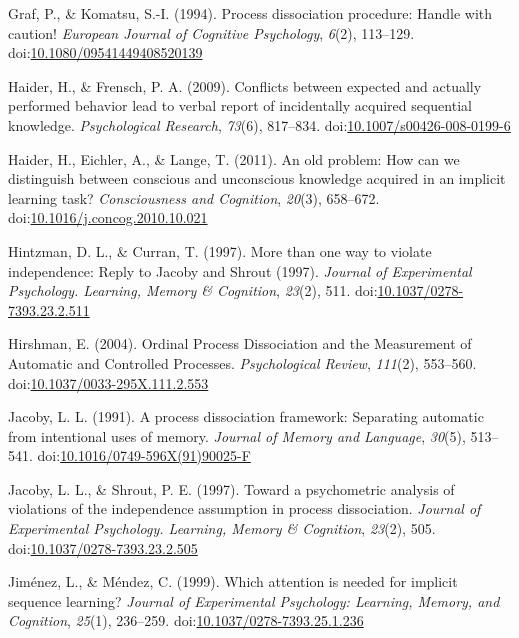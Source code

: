 \documentclass[man]{apa6}
\theoremstyle{definition}
\theoremstyle{definition}
\theoremstyle{definition}
\theoremstyle{remark}
\begin{document}
\hypertarget{ref-graf_process_1994}{}
Graf, P., \& Komatsu, S.-I. (1994). Process dissociation procedure:
Handle with caution! \emph{European Journal of Cognitive Psychology},
\emph{6}(2), 113--129.
doi:\href{https://doi.org/10.1080/09541449408520139}{10.1080/09541449408520139}

\hypertarget{ref-haider_conflicts_2009}{}
Haider, H., \& Frensch, P. A. (2009). Conflicts between expected and
actually performed behavior lead to verbal report of incidentally
acquired sequential knowledge. \emph{Psychological Research},
\emph{73}(6), 817--834.
doi:\href{https://doi.org/10.1007/s00426-008-0199-6}{10.1007/s00426-008-0199-6}

\hypertarget{ref-haider_old_2011}{}
Haider, H., Eichler, A., \& Lange, T. (2011). An old problem: How can we
distinguish between conscious and unconscious knowledge acquired in an
implicit learning task? \emph{Consciousness and Cognition},
\emph{20}(3), 658--672.
doi:\href{https://doi.org/10.1016/j.concog.2010.10.021}{10.1016/j.concog.2010.10.021}

\hypertarget{ref-hintzman_more_1997}{}
Hintzman, D. L., \& Curran, T. (1997). More than one way to violate
independence: Reply to Jacoby and Shrout (1997). \emph{Journal of
Experimental Psychology. Learning, Memory \& Cognition}, \emph{23}(2),
511.
doi:\href{https://doi.org/10.1037/0278-7393.23.2.511}{10.1037/0278-7393.23.2.511}

\hypertarget{ref-hirshman_ordinal_2004}{}
Hirshman, E. (2004). Ordinal Process Dissociation and the Measurement of
Automatic and Controlled Processes. \emph{Psychological Review},
\emph{111}(2), 553--560.
doi:\href{https://doi.org/10.1037/0033-295X.111.2.553}{10.1037/0033-295X.111.2.553}

\hypertarget{ref-jacoby_process_1991}{}
Jacoby, L. L. (1991). A process dissociation framework: Separating
automatic from intentional uses of memory. \emph{Journal of Memory and
Language}, \emph{30}(5), 513--541.
doi:\href{https://doi.org/10.1016/0749-596X(91)90025-F}{10.1016/0749-596X(91)90025-F}

\hypertarget{ref-jacoby_toward_1997}{}
Jacoby, L. L., \& Shrout, P. E. (1997). Toward a psychometric analysis
of violations of the independence assumption in process dissociation.
\emph{Journal of Experimental Psychology. Learning, Memory \&
Cognition}, \emph{23}(2), 505.
doi:\href{https://doi.org/10.1037/0278-7393.23.2.505}{10.1037/0278-7393.23.2.505}

\hypertarget{ref-jimenez_which_1999}{}
Jiménez, L., \& Méndez, C. (1999). Which attention is needed for
implicit sequence learning? \emph{Journal of Experimental Psychology:
Learning, Memory, and Cognition}, \emph{25}(1), 236--259.
doi:\href{https://doi.org/10.1037/0278-7393.25.1.236}{10.1037/0278-7393.25.1.236}
\end{document}
